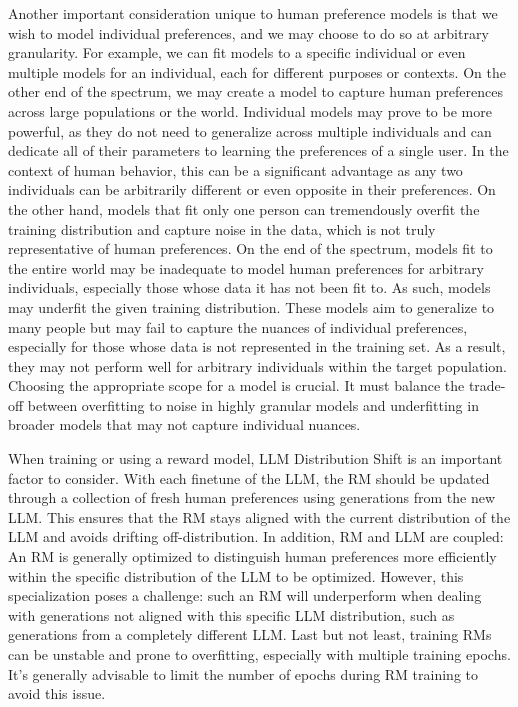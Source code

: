 \documentclass[
  letterpaper,
  numbers=noenddot,
  DIV=11]{scrreprt}
\theoremstyle{plain}
\theoremstyle{definition}
\theoremstyle{plain}
\theoremstyle{remark}
\begin{document}
Another important consideration unique to human preference models is
that we wish to model individual preferences, and we may choose to do so
at arbitrary granularity. For example, we can fit models to a specific
individual or even multiple models for an individual, each for different
purposes or contexts. On the other end of the spectrum, we may create a
model to capture human preferences across large populations or the
world. Individual models may prove to be more powerful, as they do not
need to generalize across multiple individuals and can dedicate all of
their parameters to learning the preferences of a single user. In the
context of human behavior, this can be a significant advantage as any
two individuals can be arbitrarily different or even opposite in their
preferences. On the other hand, models that fit only one person can
tremendously overfit the training distribution and capture noise in the
data, which is not truly representative of human preferences. On the end
of the spectrum, models fit to the entire world may be inadequate to
model human preferences for arbitrary individuals, especially those
whose data it has not been fit to. As such, models may underfit the
given training distribution. These models aim to generalize to many
people but may fail to capture the nuances of individual preferences,
especially for those whose data is not represented in the training set.
As a result, they may not perform well for arbitrary individuals within
the target population. Choosing the appropriate scope for a model is
crucial. It must balance the trade-off between overfitting to noise in
highly granular models and underfitting in broader models that may not
capture individual nuances.

When training or using a reward model, LLM Distribution Shift is an
important factor to consider. With each finetune of the LLM, the RM
should be updated through a collection of fresh human preferences using
generations from the new LLM. This ensures that the RM stays aligned
with the current distribution of the LLM and avoids drifting
off-distribution. In addition, RM and LLM are coupled: An RM is
generally optimized to distinguish human preferences more efficiently
within the specific distribution of the LLM to be optimized. However,
this specialization poses a challenge: such an RM will underperform when
dealing with generations not aligned with this specific LLM
distribution, such as generations from a completely different LLM. Last
but not least, training RMs can be unstable and prone to overfitting,
especially with multiple training epochs. It's generally advisable to
limit the number of epochs during RM training to avoid this issue.
\end{document}
